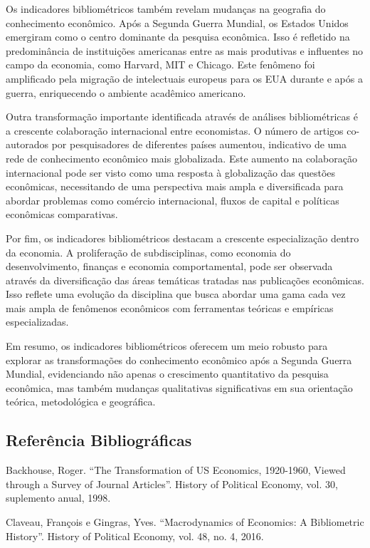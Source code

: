 \documentclass[a4paper,12pt]{article}[abntex2]
\begin{document}
Os indicadores bibliométricos também revelam mudanças na geografia do conhecimento econômico. Após a Segunda Guerra Mundial, os Estados Unidos emergiram como o centro dominante da pesquisa econômica. Isso é refletido na predominância de instituições americanas entre as mais produtivas e influentes no campo da economia, como Harvard, MIT e Chicago. Este fenômeno foi amplificado pela migração de intelectuais europeus para os EUA durante e após a guerra, enriquecendo o ambiente acadêmico americano.

Outra transformação importante identificada através de análises bibliométricas é a crescente colaboração internacional entre economistas. O número de artigos co-autorados por pesquisadores de diferentes países aumentou, indicativo de uma rede de conhecimento econômico mais globalizada. Este aumento na colaboração internacional pode ser visto como uma resposta à globalização das questões econômicas, necessitando de uma perspectiva mais ampla e diversificada para abordar problemas como comércio internacional, fluxos de capital e políticas econômicas comparativas.

Por fim, os indicadores bibliométricos destacam a crescente especialização dentro da economia. A proliferação de subdisciplinas, como economia do desenvolvimento, finanças e economia comportamental, pode ser observada através da diversificação das áreas temáticas tratadas nas publicações econômicas. Isso reflete uma evolução da disciplina que busca abordar uma gama cada vez mais ampla de fenômenos econômicos com ferramentas teóricas e empíricas especializadas.

Em resumo, os indicadores bibliométricos oferecem um meio robusto para explorar as transformações do conhecimento econômico após a Segunda Guerra Mundial, evidenciando não apenas o crescimento quantitativo da pesquisa econômica, mas também mudanças qualitativas significativas em sua orientação teórica, metodológica e geográfica.

\subsection{\textbf{Referência Bibliográficas}}
Backhouse, Roger. “The Transformation of US Economics, 1920-1960, Viewed through a
Survey of Journal Articles”. History of Political Economy, vol. 30, suplemento anual, 1998.

Claveau, François e Gingras, Yves. “Macrodynamics of Economics: A Bibliometric History”.
History of Political Economy, vol. 48, no. 4, 2016.
\end{document}
